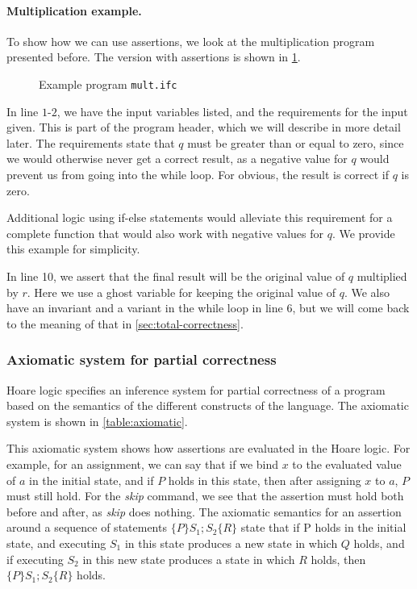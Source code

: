 \paragraph{Multiplication example.}
To show how we can use assertions, we look at the multiplication program presented before. The version with assertions is shown in \cref{figure:mult}.
\begin{figure}

\caption{Example program \texttt{mult.ifc}}
\label{figure:mult}
\end{figure}

In line $1$-$2$, we have the input variables listed, and the requirements for the input given.
This is part of the program header, which we will describe in more detail later.
The requirements state that $q$ must be greater than or equal to zero, since we would otherwise never get a correct result, as a negative value for $q$ would prevent us from going into the while loop. 
For obvious, the result is correct if $q$ is zero.

Additional logic using if-else statements would alleviate this requirement for a complete function that would also work with negative values for $q$. We provide this example for simplicity.

In line 10, we assert that the final result will be the original value of $q$ multiplied by $r$.
Here we use a ghost variable for keeping the original value of $q$.
We also have an invariant and a variant in the while loop in line 6, but we will come back to the meaning of that in \cref{sec:total-correctness}.


\subsubsection{Axiomatic system for partial correctness}
Hoare logic specifies an inference system for partial correctness of a program based on the semantics of the different constructs of the language. The axiomatic system is shown in \cref{table:axiomatic}.

This axiomatic system shows how assertions are evaluated in the Hoare logic.
For example, for an assignment, we can say that if we bind $x$ to the evaluated value of $a$ in the initial state, and if $P$ holds in this state, then after assigning $x$ to $a$, $P$ must still hold.
For the \textit{skip} command, we see that the assertion must hold both before and after, as \textit{skip} does nothing.
The axiomatic semantics for an assertion around a sequence of statements $\{P\} S_1;S_2\{R\}$ state that if P holds in the initial state, and executing $S_1$ in this state produces a new state in which $Q$ holds, and if executing $S_2$ in this new state produces a state in which $R$ holds, then $\{P\} S_1;S_2 \{R\}$ holds.

